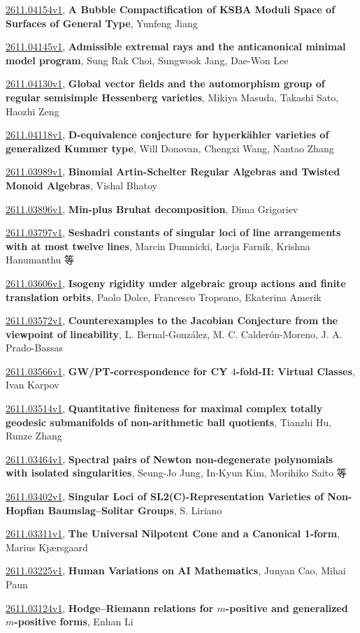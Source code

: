 \documentclass[9pt, a4paper]{article}
\theoremstyle{plain}
\theoremstyle{definition}
\theoremstyle{remark}
\newcommand{\arxiv}[3]{\href{https://arxiv.org/abs/#1}{#1}, \textbf{\textcolor{arxivblue}{#2}}, #3}
\begin{document}
\arxiv{2611.04154v1}{A Bubble Compactification of KSBA Moduli Space of Surfaces of General Type}{Yunfeng Jiang}

\arxiv{2611.04145v1}{Admissible extremal rays and the anticanonical minimal model program}{Sung Rak Choi, Sungwook Jang, Dae-Won Lee}

\arxiv{2611.04130v1}{Global vector fields and the automorphism group of regular semisimple Hessenberg varieties}{Mikiya Masuda, Takashi Sato, Haozhi Zeng}

\arxiv{2611.04118v1}{D-equivalence conjecture for hyperkähler varieties of generalized Kummer type}{Will Donovan, Chengxi Wang, Nantao Zhang}

\arxiv{2611.03989v1}{Binomial Artin-Schelter Regular Algebras and Twisted Monoid Algebras}{Vishal Bhatoy}

\arxiv{2611.03896v1}{Min-plus Bruhat decomposition}{Dima Grigoriev}

\arxiv{2611.03797v1}{Seshadri constants of singular loci of line arrangements with at most twelve lines}{Marcin Dumnicki, Łucja Farnik, Krishna Hanumanthu 等}

\arxiv{2611.03606v1}{Isogeny rigidity under algebraic group actions and finite translation orbits}{Paolo Dolce, Francesco Tropeano, Ekaterina Amerik}

\arxiv{2611.03572v1}{Counterexamples to the Jacobian Conjecture from the viewpoint of lineability}{L. Bernal-González, M. C. Calderón-Moreno, J. A. Prado-Bassas}

\arxiv{2611.03566v1}{GW/PT-correspondence for CY $4$-fold-II: Virtual Classes}{Ivan Karpov}

\arxiv{2611.03514v1}{Quantitative finiteness for maximal complex totally geodesic submanifolds of non-arithmetic ball quotients}{Tianzhi Hu, Runze Zhang}

\arxiv{2611.03464v1}{Spectral pairs of Newton non-degenerate polynomials with isolated singularities}{Seung-Jo Jung, In-Kyun Kim, Morihiko Saito 等}

\arxiv{2611.03402v1}{Singular Loci of SL2(C)-Representation Varieties of Non-Hopfian Baumslag--Solitar Groups}{S. Liriano}

\arxiv{2611.03311v1}{The Universal Nilpotent Cone and a Canonical 1-form}{Marius Kjærsgaard}

\arxiv{2611.03225v1}{Human Variations on AI Mathematics}{Junyan Cao, Mihai Paun}

\arxiv{2611.03124v1}{Hodge--Riemann relations for $m$-positive and generalized $m$-positive forms}{Enhan Li}
\end{document}
